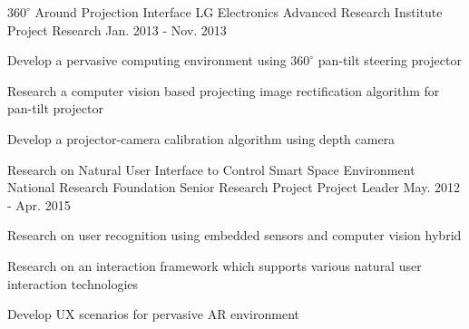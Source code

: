 \begin{cventries}
  \cventry
    {$360^{\circ}$ Around Projection Interface} %
    {LG Electronics Advanced Research Institute Project} %
    {Research} %
    {Jan. 2013 - Nov. 2013} %
    {
      \begin{cvitems} %
        \item {Develop a pervasive computing environment using $360^{\circ}$ pan-tilt steering projector}
        \item {Research a computer vision based projecting image rectification algorithm for pan-tilt projector}
        \item {Develop a projector-camera calibration algorithm using depth camera}
      \end{cvitems} 
    }

  \cventry
    {Research on Natural User Interface to Control Smart Space Environment} %
    {National Research Foundation Senior Research Project} %
    {Project Leader} %
    {May. 2012 - Apr. 2015} %
    {
      \begin{cvitems} %
        \item {Research on user recognition using embedded sensors and computer vision hybrid}
        \item {Research on an interaction framework which supports various natural user interaction technologies}
        \item {Develop UX scenarios for pervasive AR environment}
      \end{cvitems}
    }


\end{cventries}
